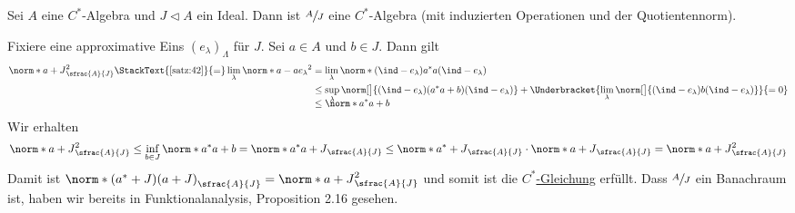 \begin{satz}[label=satz:44,{name=[Quotient einer C*-Algebra]}]
	Sei $A$ eine $C^*$-Algebra und $J \lhd A$ ein Ideal. Dann ist $\sfrac{A}{J}$ eine $C^*$-Algebra (mit induzierten Operationen und der Quotientennorm). 
\end{satz}
\begin{beweis}
	Fixiere eine approximative Eins $(e_\lambda)_\Lambda$ für $J$. Sei $a \in A$ und $b \in J$. Dann gilt
	\begin{align}
		\norm*{a+J}^2_{\sfrac{A}{J}} \StackText{\ref{satz:42}}{=} \lim_\lambda \norm*{a-a e_\lambda}^2 &= \lim_\lambda \norm*{(\ind-e_\lambda)a^*a(\ind-e_\lambda)} \\
		&\le \sup_\lambda \norm[\big]{(\ind- e_\lambda)(a^*a +b)(\ind- e_\lambda)} + \Underbracket{\lim_\lambda \norm[\big]{(\ind-e_\lambda)b(\ind-e_\lambda)}}{=0} \\[-.8em]
		&\le \norm*{a^*a+b}
	\end{align}
	Wir erhalten 
	\begin{align}
		\norm*{a+J}_{\sfrac{A}{J}}^2 \le \inf_{b \in J} \norm*{a^* a+b} = \norm*{a^*a +J}_{\sfrac{A}{J}} \le \norm*{a^* +J}_{\sfrac{A}{J}} \cdot \norm*{a+J}_{\sfrac{A}{J}} = \norm*{a+J}^2_{\sfrac{A}{J}}
	\end{align}
	Damit ist $\norm*{(a^* +J)(a+J)}_{\sfrac{A}{J}} = \norm*{a+J}^2_{\sfrac{A}{J}}$ und somit ist die \hyperref[def:22]{$C^*$-Gleichung} erfüllt.
	Dass $\sfrac{A}{J}$ ein Banachraum ist, haben wir bereits in Funktionalanalysis, Proposition 2.16 gesehen. 
\end{beweis}

